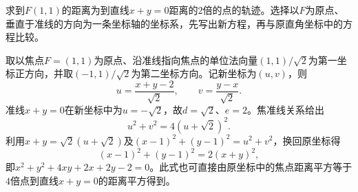 求到\(F(1,1)\)的距离为到直线\(x+y=0\)距离的\(2\)倍的点的轨迹。选择以\(F\)为原点、垂直于准线的方向为一条坐标轴的坐标系，先写出新方程，再与原直角坐标中的方程比较。
\par
\solutionanswer
取以焦点\(F=(1,1)\)为原点、沿准线指向焦点的单位法向量\((1,1)/\sqrt2\)为第一坐标正方向，并取\((-1,1)/\sqrt2\)为第二坐标方向。记新坐标为\((u,v)\)，则
\[
u=\frac{x+y-2}{\sqrt2},\qquad v=\frac{y-x}{\sqrt2}.
\]
准线\(x+y=0\)在新坐标中为\(u=-\sqrt2\)，故\(d=\sqrt2\)、\(e=2\)。焦准线关系给出
\[
u^2+v^2=4(u+\sqrt2)^2.
\]
利用\(x+y=\sqrt2(u+\sqrt2)\)及\((x-1)^2+(y-1)^2=u^2+v^2\)，换回原坐标得
\[
(x-1)^2+(y-1)^2=2(x+y)^2,
\]
即\(x^2+y^2+4xy+2x+2y-2=0\)。此式也可直接由原坐标中的焦点距离平方等于\(4\)倍点到直线\(x+y=0\)的距离平方得到。
\par
